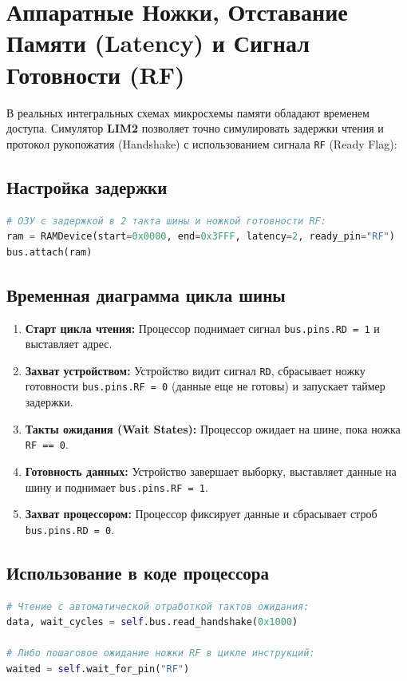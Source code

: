 \documentclass[11pt,a4paper]{article}
\begin{document}
\section{Аппаратные Ножки, Отставание Памяти (Latency) и Сигнал Готовности (RF)}

В реальных интегральных схемах микросхемы памяти обладают временем доступа. Симулятор \textbf{LIM2} позволяет точно симулировать задержки чтения и протокол рукопожатия (Handshake) с использованием сигнала \texttt{RF} (Ready Flag):

\subsection{Настройка задержки}
\begin{lstlisting}[language=Python]
# ОЗУ с задержкой в 2 такта шины и ножкой готовности RF:
ram = RAMDevice(start=0x0000, end=0x3FFF, latency=2, ready_pin="RF")
bus.attach(ram)
\end{lstlisting}

\subsection{Временная диаграмма цикла шины}
\begin{enumerate}
    \item \textbf{Старт цикла чтения:} Процессор поднимает сигнал \texttt{bus.pins.RD = 1} и выставляет адрес.
    \item \textbf{Захват устройством:} Устройство видит сигнал \texttt{RD}, сбрасывает ножку готовности \texttt{bus.pins.RF = 0} (данные еще не готовы) и запускает таймер задержки.
    \item \textbf{Такты ожидания (Wait States):} Процессор ожидает на шине, пока ножка \texttt{RF == 0}.
    \item \textbf{Готовность данных:} Устройство завершает выборку, выставляет данные на шину и поднимает \texttt{bus.pins.RF = 1}.
    \item \textbf{Захват процессором:} Процессор фиксирует данные и сбрасывает строб \texttt{bus.pins.RD = 0}.
\end{enumerate}

\subsection{Использование в коде процессора}
\begin{lstlisting}[language=Python]
# Чтение с автоматической отработкой тактов ожидания:
data, wait_cycles = self.bus.read_handshake(0x1000)

# Либо пошаговое ожидание ножки RF в цикле инструкций:
waited = self.wait_for_pin("RF")
\end{lstlisting}
\end{document}
